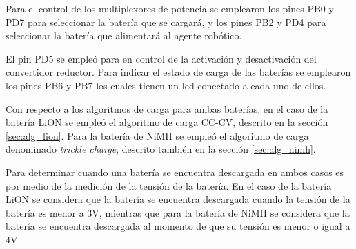     Para el control de los multiplexores de potencia se emplearon los pines
    PB0 y PD7 para seleccionar la batería que se cargará, y los pines PB2 y 
    PD4 para seleccionar la batería que alimentará al agente robótico.

    El pin PD5 se empleó para en control de la activación y desactivación
    del convertidor reductor. Para indicar el estado de carga de las baterías
    se emplearon los pines PB6 y PB7 los cuales tienen un led conectado a cada
    uno de ellos.

    Con respecto a los algoritmos de carga para ambas baterías, en el caso
    de la batería LiON se empleó el algoritmo de carga CC-CV, descrito en la
    sección \ref{sec:alg_lion}. Para la batería de NiMH se empleó el
    algoritmo de carga denominado \textit{trickle charge}, descrito también en
    la sección \ref{sec:alg_nimh}.

    Para determinar cuando una batería se encuentra descargada en ambos casos es por medio
de la medición de la tensión de la batería. En el caso de la batería LiON se considera
que la batería se encuentra descargada cuando la tensión de la batería es menor a 3V,
mientras que para la batería de NiMH se considera que la batería se encuentra descargada
al momento de que su tensión es menor o igual a 4V.




